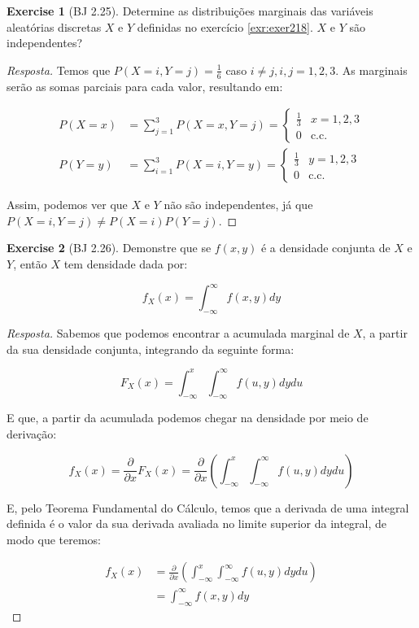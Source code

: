 \documentclass[
]{article}
\theoremstyle{definition}
\theoremstyle{definition}
\theoremstyle{definition}
\newtheorem{exercise}{Exercise}[section]
\theoremstyle{definition}
\theoremstyle{remark}
\begin{document}
\begin{exercise}[BJ 2.25]
Determine as distribuições marginais das variáveis aleatórias discretas \(X\) e \(Y\) definidas no exercício \ref{exr:exer218}. \(X\) e \(Y\) são independentes?
\end{exercise}

\begin{proof}[Resposta]
Temos que \(P(X = i, Y = j) = \frac{1}{6}\) caso \(i \neq j, i,j = 1,2,3\). As marginais serão as somas parciais para cada valor, resultando em:

\begin{align*}
P(X = x) &= \sum_{j=1}^{3}P(X=x,Y=j) = \begin{cases}
\frac{1}{3} & x=1,2,3 \\
0 & \text{c.c.}
\end{cases} \\
P(Y = y) &= \sum_{i=1}^{3}P(X=i,Y=y) = \begin{cases}
\frac{1}{3} & y=1,2,3 \\
0 & \text{c.c.}
\end{cases}
\end{align*}

Assim, podemos ver que \(X\) e \(Y\) não são independentes, já que \(P(X = i, Y = j) \neq P(X = i)P(Y = j)\).
\end{proof}

\begin{exercise}[BJ 2.26]
Demonstre que se \(f(x,y)\) é a densidade conjunta de \(X\) e \(Y\), então \(X\) tem densidade dada por:

\begin{equation*}
f_{X}(x) = \int_{-\infty}^{\infty}f(x,y)dy
\end{equation*}
\end{exercise}

\begin{proof}[Resposta]
Sabemos que podemos encontrar a acumulada marginal de \(X\), a partir da sua densidade conjunta, integrando da seguinte forma:

\begin{equation*}
F_{X}(x) = \int_{-\infty}^{x}\int_{-\infty}^{\infty}f(u,y)dydu
\end{equation*}

E que, a partir da acumulada podemos chegar na densidade por meio de derivação:

\begin{equation*}
f_{X}(x) = \frac{\partial}{\partial x} F_{X}(x) = \frac{\partial}{\partial x}\left(\int_{-\infty}^{x}\int_{-\infty}^{\infty}f(u,y)dydu\right)
\end{equation*}

E, pelo Teorema Fundamental do Cálculo, temos que a derivada de uma integral definida é o valor da sua derivada avaliada no limite superior da integral, de modo que teremos:

\begin{align*}
f_{X}(x) &= \frac{\partial}{\partial x}\left(\int_{-\infty}^{x}\int_{-\infty}^{\infty}f(u,y)dydu\right) \\
&= \int_{-\infty}^{\infty}f(x,y)dy
\end{align*}
\end{proof}
\end{document}
